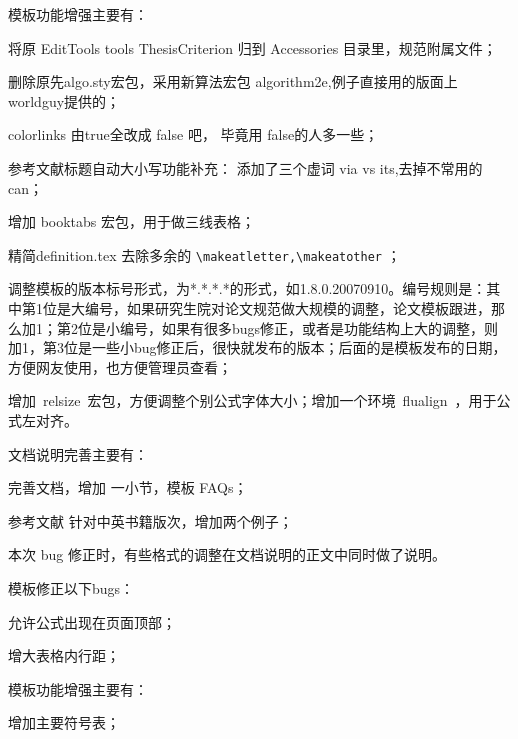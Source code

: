 模板功能增强主要有：
\begin{hitlist}
  \item 将原 EditTools tools ThesisCriterion 归到 Accessories 目录里，规范附属文件；
  \item 删除原先algo.sty宏包，采用新算法宏包 algorithm2e,例子直接用的版面上worldguy提供的；
  \item colorlinks 由true全改成 false 吧， 毕竟用 false的人多一些；
  \item 参考文献标题自动大小写功能补充： 添加了三个虚词 via vs its,去掉不常用的 can；
  \item 增加 booktabs 宏包，用于做三线表格；
  \item 精简definition.tex 去除多余的 \verb|\makeatletter,\makeatother| ；
  \item 调整模板的版本标号形式，为*.*.*.*的形式，如1.8.0.20070910。编号规则是：其中第1位是大编号，如果研究生院对论文规范做大规模的调整，论文模板跟进，那么加1；第2位是小编号，如果有很多bugs修正，或者是功能结构上大的调整，则加1，第3位是一些小bug修正后，很快就发布的版本；后面的是模板发布的日期，方便网友使用，也方便管理员查看；
  \item 增加~relsize~宏包，方便调整个别公式字体大小；增加一个环境~flualign~，用于公式左对齐。
\end{hitlist}

文档说明完善主要有：
\begin{hitlist}
  \item 完善文档，增加 一小节，模板 FAQs；
  \item 参考文献 针对中英书籍版次，增加两个例子；
  \item 本次 bug 修正时，有些格式的调整在文档说明的正文中同时做了说明。
\end{hitlist}


模板修正以下bugs：
\begin{hitlist}
    \item 允许公式出现在页面顶部；
    \item 增大表格内行距；
\end{hitlist}


模板功能增强主要有：
\begin{hitlist}
    \item 增加主要符号表；  
\end{hitlist}

